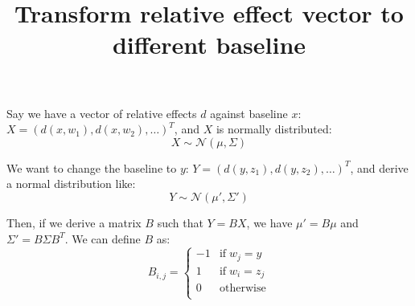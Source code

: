 \documentclass[a4paper]{article}
\title{Transform relative effect vector to different baseline}
\date{}
\begin{document}
\maketitle

Say we have a vector of relative effects $d$ against baseline $x$: $X = (d(x, w_1), d(x, w_2), \dots)^T$, and $X$ is normally distributed:
$$
X \sim \mathcal{N}(\mu, \Sigma)
$$

We want to change the baseline to $y$: $Y = (d(y, z_1), d(y, z_2), \dots)^T$, and derive a normal distribution like:
$$
Y \sim \mathcal{N}(\mu', \Sigma')
$$

Then, if we derive a matrix $B$ such that $Y = BX$, we have $\mu' = B\mu$ and $\Sigma' = B\Sigma B^T$. We can define $B$ as:
$$
B_{i,j} = \left\{
\begin{array}{ll}
-1 & \mathrm{if}\; w_j = y \\
1 & \mathrm{if}\; w_i = z_j \\
0 & \mathrm{otherwise}\\
\end{array}
\right.
$$
\end{document}
